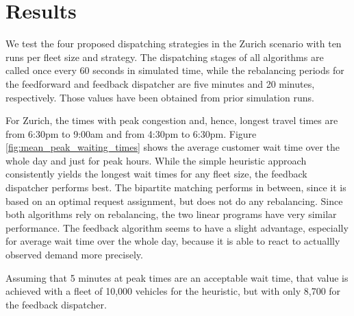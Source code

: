 \section{Results}
\label{sec:results}

We test the four proposed dispatching strategies in the Zurich scenario with ten
runs per fleet size and strategy.%
The dispatching stages of all algorithms are called once every 60 seconds in
simulated time, while the rebalancing periods for the feedforward and feedback
dispatcher are five minutes and 20 minutes, respectively. Those values have been
obtained from prior simulation runs.

For Zurich, the times with peak congestion and, hence, longest travel times
are from 6:30pm to 9:00am and from 4:30pm to 6:30pm. Figure \ref{fig:mean_peak_waiting_times}
shows the average customer wait time over the whole day and just for peak hours.
While the simple heuristic approach consistently yields the longest wait times
for any fleet size, the feedback dispatcher performs best. The bipartite matching
performs in between, since it is based on an optimal request assignment, but does
not do any rebalancing. Since both algorithms rely on rebalancing, the two linear
programs have very similar performance. The feedback algorithm seems to have a
slight advantage, especially for average wait time over the whole day, because it
is able to react to actuallly observed demand more precisely.

Assuming that 5 minutes at peak times are an acceptable wait time, that value is
achieved with a fleet of 10,000 vehicles for the heuristic, but with only 8,700
for the feedback dispatcher.

\captionsetup[subfigure]{width=0.9\textwidth}

